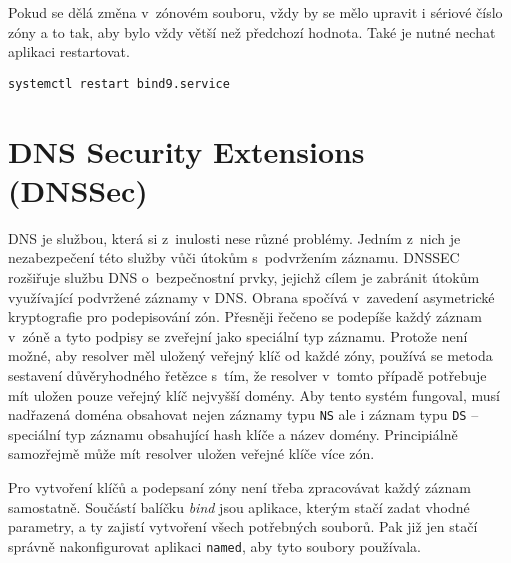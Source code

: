 Pokud se dělá změna v~zónovém souboru, vždy by se mělo upravit i sériové číslo zóny a to tak, aby bylo vždy větší než předchozí hodnota. Také je nutné nechat aplikaci restartovat.
\begin{verbatim}
systemctl restart bind9.service
\end{verbatim}


\section{DNS Security Extensions (DNSSec)}
\label{dnssec}

DNS je službou, která si z~inulosti nese různé problémy. Jedním z~nich je
nezabezpečení této služby vůči útokům s~podvržením záznamu.
DNSSEC rozšiřuje službu DNS o~bezpečnostní prvky, jejichž cílem je zabránit
útokům využívající podvržené záznamy v DNS. Obrana spočívá v~zavedení
asymetrické kryptografie pro podepisování zón. Přesněji řečeno se podepíše každý
záznam v~zóně a tyto podpisy se zveřejní jako speciální typ záznamu. Protože není možné, aby resolver měl uložený veřejný klíč od každé zóny, používá se metoda sestavení důvěryhodného řetězce s~tím, že resolver v~tomto případě potřebuje mít uložen pouze veřejný klíč nejvyšší domény. Aby tento systém fungoval, musí nadřazená doména obsahovat nejen záznamy typu {\tt NS} ale i záznam typu {\tt DS} -- speciální typ záznamu obsahující hash klíče a název domény. Principiálně samozřejmě může mít resolver uložen veřejné klíče více zón.

Pro vytvoření klíčů a podepsaní zóny není třeba zpracovávat každý záznam samostatně. Součástí balíčku {\em bind} jsou aplikace, kterým stačí zadat vhodné parametry, a ty zajistí vytvoření všech potřebných souborů. Pak již jen stačí správně nakonfigurovat aplikaci {\tt named}, aby tyto soubory používala.

